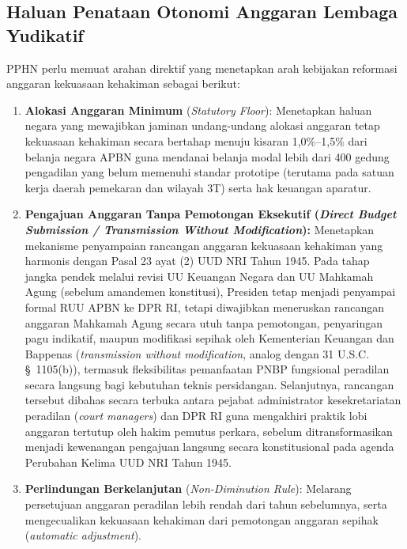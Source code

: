 \documentclass[12pt,a4paper,twocolumn]{article}
\begin{document}
\subsection{Haluan Penataan Otonomi Anggaran Lembaga Yudikatif}
PPHN perlu memuat arahan direktif yang menetapkan arah kebijakan reformasi anggaran kekuasaan kehakiman sebagai berikut:
\begin{enumerate}
    \item \textbf{Alokasi Anggaran Minimum} (\textit{Statutory Floor}): Menetapkan haluan negara yang mewajibkan jaminan undang-undang alokasi anggaran tetap kekuasaan kehakiman secara bertahap menuju kisaran 1,0\%--1,5\% dari belanja negara APBN guna mendanai belanja modal lebih dari 400 gedung pengadilan yang belum memenuhi standar prototipe (terutama pada satuan kerja daerah pemekaran dan wilayah 3T) serta hak keuangan aparatur.
    \item \textbf{Pengajuan Anggaran Tanpa Pemotongan Eksekutif (\textit{Direct Budget Submission / Transmission Without Modification}):} Menetapkan mekanisme penyampaian rancangan anggaran kekuasaan kehakiman yang harmonis dengan Pasal 23 ayat (2) UUD NRI Tahun 1945. Pada tahap jangka pendek melalui revisi UU Keuangan Negara dan UU Mahkamah Agung (sebelum amandemen konstitusi), Presiden tetap menjadi penyampai formal RUU APBN ke DPR RI, tetapi diwajibkan meneruskan rancangan anggaran Mahkamah Agung secara utuh tanpa pemotongan, penyaringan pagu indikatif, maupun modifikasi sepihak oleh Kementerian Keuangan dan Bappenas (\textit{transmission without modification}, analog dengan 31 U.S.C. \S\ 1105(b)), termasuk fleksibilitas pemanfaatan PNBP fungsional peradilan secara langsung bagi kebutuhan teknis persidangan. Selanjutnya, rancangan tersebut dibahas secara terbuka antara pejabat administrator kesekretariatan peradilan (\textit{court managers}) dan DPR RI guna mengakhiri praktik lobi anggaran tertutup oleh hakim pemutus perkara, sebelum ditransformasikan menjadi kewenangan pengajuan langsung secara konstitusional pada agenda Perubahan Kelima UUD NRI Tahun 1945.
    \item \textbf{Perlindungan Berkelanjutan} (\textit{Non-Diminution Rule}): Melarang persetujuan anggaran peradilan lebih rendah dari tahun sebelumnya, serta mengecualikan kekuasaan kehakiman dari pemotongan anggaran sepihak (\textit{automatic adjustment}).

\end{enumerate}
\end{document}
